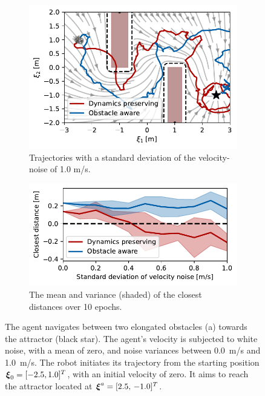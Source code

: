 \begin{figure}[htbp]
    \centering
    \begin{subfigure}{\columnwidth}
      \centerline{\includegraphics[width=\textwidth]{figures/trajectory_velocity_noise}}
      \caption{Trajectories with a standard deviation of the velocity-noise of 1.0 m/s.}
      \label{fig:trajectory_velocity_noise}
    \end{subfigure}
    \begin{subfigure}{\columnwidth}
    \includegraphics[width=\textwidth]{figures/comparison_velocity_noise}
      \caption{The mean and variance (shaded) of the closest distances over 10 epochs.}
      \label{fig:comparison_velocity_noise}
    \end{subfigure}
	\caption{The agent navigates between two elongated obstacles (a) towards the attractor (black star). The agent's velocity is subjected to white noise, with a mean of zero, and noise variances between \qty{0.0}{m/s} and \qty{1.0}{m/s}. The robot initiates its trajectory from the starting position $\boldsymbol{\xi}_0 = [-2.5, 1.0]^T$, with an initial velocity of zero. It aims to reach the attractor located at $\boldsymbol{\xi}^a = [2.5, \, -1.0]^T$.}
\label{fig:velocity_noise}
\end{figure}

